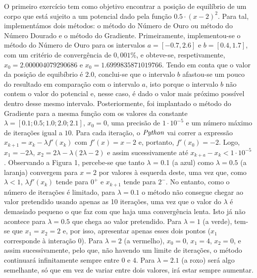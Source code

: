 \documentclass[aps,pre,twocolumn,showpacs,amsmath,amssymb]{revtex4-1}
\begin{document}
O primeiro exercício tem como objetivo encontrar a posição de equilíbrio de um corpo que está sujeito a um potencial dado pela função $0.5\cdot (x-2)^2$. Para tal, implementámos dois métodos: o método do Número de Ouro ou método do Número Dourado e o método do Gradiente. \newline
\indent Primeiramente, implementou-se o método do Número de Ouro para os intervalos $a = [-0.7,2.6]$ e $b = [0.4, 1.7]$, com um critério de convergência de $0,001\%$, e obteve-se, respetivamente, $x_0 = 2.000004079290686$ e $x_0 = 1.6999835871019766$. Tendo em conta que o valor da posição de equibíbrio é $2.0$, conclui-se que o intervalo $b$ afastou-se um pouco do resultado em comparação com o intervalo $a$, isto porque o intervalo $b$ não contem o valor do potencial e, nesse caso, é dado o valor mais próximo possível dentro desse mesmo intervalo. \newline
\indent Posteriormente, foi implantado o método do Gradiente para a mesma função com os valores da constante $\lambda = [0.1; 0.5; 1.0; 2.0; 2.1]$, $x_0 = 0$, uma precisão de $1 \cdot 10^{-5}$ e um número máximo de iterações igual a $10$. \newline
\indent Para cada iteração, o $\it{Python}$ vai correr a expressão $x_{k+1} = x_k - \lambda f'(x_k)$ com $f'(x) = x - 2$ e, portanto, $f'(x_0) = - 2$. Logo, $x_1 = - 2\lambda$, $x_2 = 2\lambda - \lambda(2\lambda-2)$ e assim sucessivamente até $x_{k+a} - x_k < 1\cdot 10^{-5}$. \newline
\indent Observando a Figura 1, percebe-se que tanto $\lambda$ = 0.1 (a azul) como $\lambda = 0.5$ (a laranja) convergem para $x = 2$ por valores à esquerda deste, uma vez que, como $\lambda < 1$, $\lambda f'(x_k)$ tende para $0^+$ e $x_{k+1}$ tende para $2^-$. No entanto, como o número de iterações é limitado, para $\lambda = 0.1$ o método não consegue chegar ao valor pretendido usando apenas as 10 iterações, uma vez que o valor do $\lambda$ é demasiado pequeno o que faz com que haja uma convergência lenta. Isto já não acontece para $\lambda = 0.5$ que chega ao valor pretendido. Para $\lambda = 1$ (a verde), tem-se que $x_1 = x_2 = 2$ e, por isso, apresentar apenas esses dois pontos ($x_1$ corresponde à interação $0$). Para $\lambda = 2$ (a vermelho), $x_0 = 0$, $x_1 = 4$, $x_2 = 0$, e assim sucessivamente, pelo que, não havendo um limite de iterações, o método continuará infinitamente sempre entre $0$ e $4$. Para $\lambda = 2.1$ (a roxo) será algo semelhante, só que em vez de variar entre dois valores, irá estar sempre aumentar.
\end{document}
